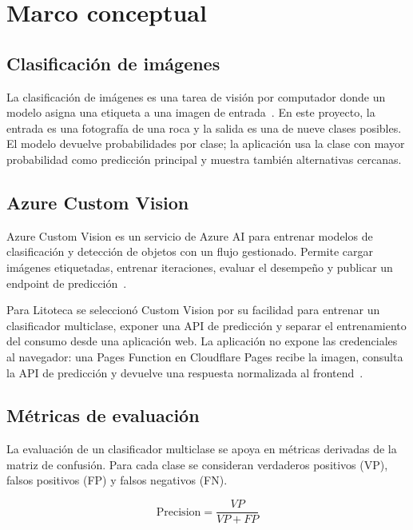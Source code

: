 \section{Marco conceptual}
\label{sec:background}

\subsection{Clasificación de imágenes}

La clasificación de imágenes es una tarea de visión por computador donde un modelo
asigna una etiqueta a una imagen de entrada~\cite{lecun2015deep,he2016deep}. En
este proyecto, la entrada es una fotografía de una roca y la salida es una de nueve
clases posibles. El modelo devuelve probabilidades por clase; la aplicación usa la
clase con mayor probabilidad como predicción principal y muestra también
alternativas cercanas.

\subsection{Azure Custom Vision}

Azure Custom Vision es un servicio de Azure AI para entrenar modelos de
clasificación y detección de objetos con un flujo gestionado. Permite cargar
imágenes etiquetadas, entrenar iteraciones, evaluar el desempeño y publicar un
endpoint de predicción~\cite{azurecustomvision}.

Para Litoteca se seleccionó Custom Vision por su facilidad para entrenar un
clasificador multiclase, exponer una API de predicción y separar el entrenamiento
del consumo desde una aplicación web. La aplicación no expone las credenciales al
navegador: una Pages Function en Cloudflare Pages recibe la imagen, consulta la
API de predicción y devuelve una respuesta normalizada al
frontend~\cite{cloudflarefunctions}.

\subsection{Métricas de evaluación}

La evaluación de un clasificador multiclase se apoya en métricas derivadas de la
matriz de confusión. Para cada clase se consideran verdaderos positivos (VP),
falsos positivos (FP) y falsos negativos (FN).

\begin{equation}
  \mathrm{Precision} = \frac{VP}{VP + FP}
  \label{eq:precision}
\end{equation}

